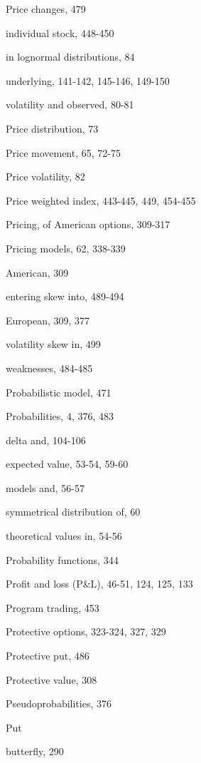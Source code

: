 \noindent Price changes, 479\par
\noindent individual stock, 448-450\par
\noindent in lognormal distributions, 84\par
\noindent underlying, 141-142, 145-146, 149-150\par
\noindent volatility and observed, 80-81\par
\noindent Price distribution, 73\par
\noindent Price movement, 65, 72-75\par
\noindent Price volatility, 82\par
\noindent Price weighted index, 443-445, 449, 454-455\par
\noindent Pricing, of American options, 309-317\par
\noindent Pricing models, 62, 338-339\par
\noindent American, 309\par
\noindent entering skew into, 489-494\par
\noindent European, 309, 377\par
\noindent volatility skew in, 499\par
\noindent weaknesses, 484-485\par
\noindent Probabilistic model, 471\par
\noindent Probabilities, 4, 376, 483\par
\noindent delta and, 104-106\par
\noindent expected value, 53-54, 59-60\par
\noindent models and, 56-57\par
\noindent symmetrical distribution of, 60\par
\noindent theoretical values in, 54-56\par
\noindent Probability functions, 344\par
\noindent Profit and loss (P\&L), 46-51, 124, 125, 133\par
\noindent Program trading, 453\par
\noindent Protective options, 323-324, 327, 329\par
\noindent Protective put, 486\par
\noindent Protective value, 308\par
\noindent Pseudoprobabilities, 376\par
\noindent Put\par
\noindent butterfly, 290\par

